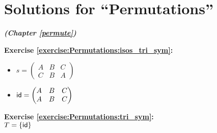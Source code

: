 
\section{Solutions for ``Permutations''}
\noindent\textbf{\textit{ (Chapter \ref{permute})}}\bigskip


\noindent\textbf{Exercise \ref{exercise:Permutations:isos_tri_sym}:}
\begin{multicols}{2}
\begin{itemize}
\item
$s = \begin{pmatrix}
A & B & C\\
C & B & A
\end{pmatrix}$

\item
$\sf{id} = \begin{pmatrix}
A & B & C \\
A & B & C
\end{pmatrix}$
\end{itemize}
\end{multicols}

\noindent\textbf{Exercise \ref{exercise:Permutations:tri_sym}:}\\
$T = \{\sf{id}\}$\\

